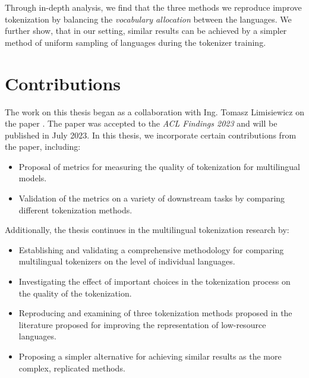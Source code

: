 
Through in-depth analysis, we find that the three methods we reproduce \cite{chung_improving_2020,zheng_allocating_2021,liang_xlm-v_2023} improve tokenization by balancing the \textit{vocabulary allocation} between the languages. We further show, that in our setting, similar results can be achieved by a simpler method of uniform sampling of languages during the tokenizer training. 

\section{Contributions}

The work on this thesis began as a collaboration with Ing. Tomasz Limisiewicz on the paper . The paper was accepted to the \textit{ACL Findings 2023} and will be published in July 2023. In this thesis, we incorporate certain contributions from the paper, including:

\begin{itemize}
    \item Proposal of metrics for measuring the quality of tokenization for multilingual models.
    \item Validation of the metrics on a variety of downstream tasks by comparing different tokenization methods.
\end{itemize}

Additionally, the thesis continues in the multilingual tokenization research by:

\begin{itemize}
    \item Establishing and validating a comprehensive methodology for comparing multilingual tokenizers on the level of individual languages.
    \item Investigating the effect of important choices in the tokenization process on the quality of the tokenization.
    \item Reproducing and examining of three tokenization methods proposed in the literature proposed for improving the representation of low-resource languages.
    \item Proposing a simpler alternative for achieving similar results as the more complex, replicated methods.
\end{itemize}


